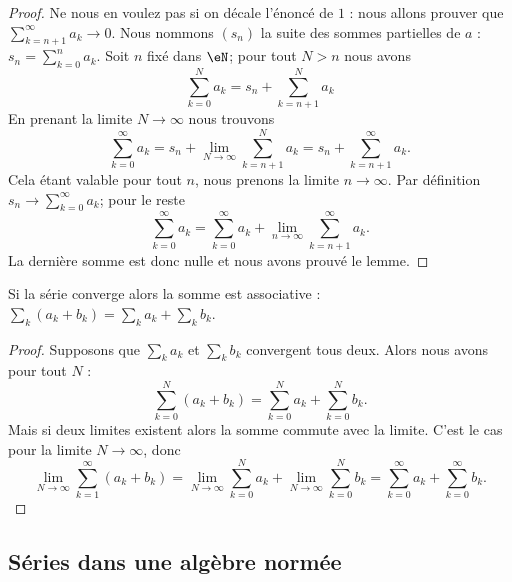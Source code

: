 \begin{proof}
    Ne nous en voulez pas si on décale l'énoncé de \( 1\) : nous allons prouver que \( \sum_{k=n+1}^{\infty}a_k\to 0\). Nous nommons \( (s_n)\) la suite des sommes partielles de \( a\) : \( s_n=\sum_{k=0}^na_k\). Soit \( n\) fixé dans \( \eN\); pour tout \( N>n\) nous avons
    \begin{equation}
        \sum_{k=0}^Na_k=s_n+\sum_{k=n+1}^Na_k
    \end{equation}
    En prenant la limite \( N\to \infty\) nous trouvons
    \begin{equation}
        \sum_{k=0}^{\infty}a_k=s_n+\lim_{N\to \infty} \sum_{k=n+1}^Na_k=s_n+\sum_{k=n+1}^{\infty}a_k.
    \end{equation}
    Cela étant valable pour tout \( n\), nous prenons la limite \( n\to\infty\). Par définition \( s_n\to\sum_{k=0}^{\infty}a_k\); pour le reste
    \begin{equation}
        \sum_{k=0}^{\infty}a_k=\sum_{k=0}^{\infty}a_k+\lim_{n\to \infty} \sum_{k=n+1}^{\infty}a_k.
    \end{equation}
    La dernière somme est donc nulle et nous avons prouvé le lemme.
\end{proof}

\begin{proposition}     \label{PROPooUEBWooUQBQvP}
	Si la série converge alors la somme est associative :
	\( \sum_k (a_k+b_k) = \sum_k a_k + \sum_k b_k \).
\end{proposition}

\begin{proof}
	Supposons que \( \sum_ka_k\) et \( \sum_kb_k\) convergent tous deux. Alors nous avons pour tout \( N\) :
	\begin{equation}
		\sum_{k=0}^N(a_k+b_k)=\sum_{k=0}^Na_k+\sum_{k=0}^Nb_k.
	\end{equation}
	Mais si deux limites existent alors la somme commute avec la limite. C'est le cas pour la limite \( N\to \infty\), donc
	\begin{equation}
        \lim_{N\to \infty} \sum_{k=1}^{\infty}(a_k+b_k)=\lim_{N\to \infty} \sum_{k=0}^{N}a_k+\lim_{N\to \infty} \sum_{k=0}^{N}b_k=\sum_{k=0}^{\infty}a_k+\sum_{k=0}^{\infty}b_k.
	\end{equation}
\end{proof}


\subsection{Séries dans une algèbre normée}

